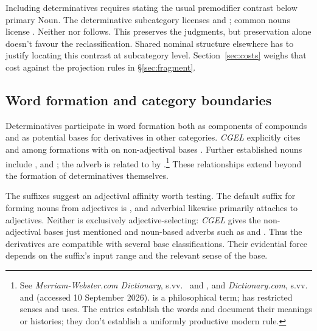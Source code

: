 \documentclass[12pt]{article}
\begin{document}
Including determinatives requires stating the usual premodifier contrast below primary Noun. The determinative subcategory licenses  and ; common nouns license . Neither  nor  follows. This preserves the judgments, but preservation alone doesn't favour the reclassification. Shared nominal structure elsewhere has to justify locating this contrast at subcategory level. Section~\ref{sec:costs} weighs that cost against the projection rules in §\ref{sec:fragment}.

\subsection{Word formation and category boundaries}\label{sec:word-formation}

Determinatives participate in word formation both as components of compounds and as potential bases for derivatives in other categories. \textit{CGEL} explicitly cites  and  among formations with  on non-adjectival bases \citep[Ch.~19, §5.7.2(i)]{huddleston2002}. Further established nouns include ,  and ; the adverb  is related to  by .\footnote{See \textit{Merriam-Webster.com Dictionary}, s.vv.\ \href{https://www.merriam-webster.com/dictionary/thisness}{} and \href{https://www.merriam-webster.com/dictionary/fewness}{}, and \textit{Dictionary.com}, s.vv.\ \href{https://www.dictionary.com/browse/muchness}{} and \href{https://www.dictionary.com/browse/mostly}{} (accessed 10 September 2026).  is a philosophical term;  has restricted senses and uses. The entries establish the words and document their meanings or histories; they don't establish a uniformly productive modern rule.} These relationships extend beyond the formation of determinatives themselves.

The suffixes suggest an adjectival affinity worth testing. The default suffix for forming nouns from adjectives is , and adverbial  likewise primarily attaches to adjectives. Neither is exclusively adjective-selecting: \textit{CGEL} gives the non-adjectival  bases just mentioned and noun-based adverbs such as  and  \citep[566; Ch.~19, §5.7.2(i)]{huddleston2002}. Thus the derivatives are compatible with several base classifications. Their evidential force depends on the suffix's input range and the relevant sense of the base.
\end{document}
